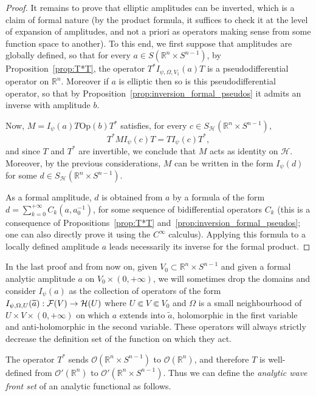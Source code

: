 \documentclass[10pt]{amsart}
\theoremstyle{definition}\newtheorem{defi}[theo]{Definition}\newtheorem{rema}[theo]{Remark}\newtheorem{exam}[theo]{Example}\newtheorem{exem}[theo]{Example}\newtheorem{nota}[theo]{Notation}
\newcommand{\Opp}{\mathrm{Op}}
\newcommand{\clO}{\mathcal{O}}
\newcommand{\clF}{\mathcal{F}}
\newcommand{\clH}{\mathcal{H}}
\newcommand\1{\mathds{1}}
\newcommand{\R}{\mathbb{R}}
\renewcommand*{\to}{\mathchoice{\longrightarrow}{\rightarrow}{\rightarrow}{\rightarrow}}
\begin{document}
\begin{proof}
It remains to prove that elliptic amplitudes can be inverted, which is a claim of formal nature (by the product formula, it suffices to check it at the level of expansion of amplitudes, and not a priori as operators making sense from some function space to another). To this end, we first suppose that amplitudes are globally defined, so that for every $a\in S(\R^n\times S^{n-1})$, by Proposition~\ref{prop:T*T}, the operator $T^*I_{\psi,\Omega,V_1}(a)T$ is a pseudodifferential operator on $\R^n$. Moreover if $a$ is elliptic then so is this pseudodifferential operator, so that by Proposition~\ref{prop:inversion_formal_pseudos} it admits an inverse with amplitude $b$.

Now, $M=I_{\psi}(a)T\Opp(b)T^*$ satisfies, for every $c\in S_{\clH}(\R^n\times S^{n-1})$,
\[
T^*MI_{\psi}(c)T=TI_{\psi}(c)T^*,
\]
and since $T$ and $T^*$ are invertible, we conclude that $M$ acts as identity on $\clH$. Moreover, by the previous considerations, $M$ can be written in the form $I_{\psi}(d)$ for some $d\in S_{\clH}(\R^n\times S^{n-1})$.

As a formal amplitude, $d$ is obtained from $a$ by a formula of the form $d=\sum_{k=0}^{+\infty}C_k(a,a_0^{-1})$, for some sequence of bidifferential operators $C_k$ (this is a consequence of Propositions~\ref{prop:T*T} and~\ref{prop:inversion_formal_pseudos}; one can also directly prove it using the $C^{\infty}$ calculus). Applying this formula to a locally defined amplitude $a$ leads necessarily its inverse for the formal product.
\end{proof}

In the last proof and from now on, given $V_0\subset \R^n\times S^{n-1}$ and given a formal analytic amplitude $a$ on $V_0\times (0,+\infty)$, we will sometimes drop the domains and consider $I_{\psi}(a)$ as the collection of operators of the form $I_{\psi,\Omega,U}(\widetilde{a}):\clF(V)\to \clH(U)$ where $U\Subset V\Subset V_0$ and $\Omega$ is a small neighbourhood of $U\times V\times (0,+\infty)$ on which $a$ extends into $\widetilde{a}$, holomorphic in the first variable and anti-holomorphic in the second variable. These operators will always strictly decrease the definition set of the function on which they act.



The operator $T^*$ sends $\clO(\R^n\times S^{n-1})$ to $\clO(\R^n)$, and therefore $T$ is well-defined from $\clO'(\R^n)$ to $\clO'(\R^n\times S^{n-1})$. Thus we can define the \emph{analytic wave front set} of an analytic functional as follows.
\end{document}
